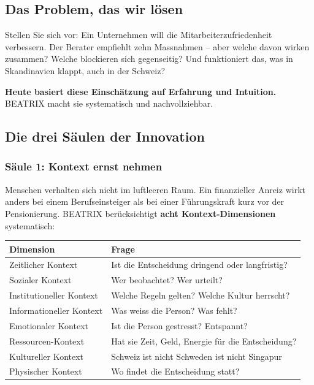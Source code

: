 \documentclass[11pt,a4paper]{article}
\begin{document}
\subsection{Das Problem, das wir lösen}

Stellen Sie sich vor: Ein Unternehmen will die Mitarbeiterzufriedenheit verbessern. Der Berater empfiehlt zehn Massnahmen -- aber welche davon wirken zusammen? Welche blockieren sich gegenseitig? Und funktioniert das, was in Skandinavien klappt, auch in der Schweiz?

\begin{insightbox}
\textbf{Heute basiert diese Einschätzung auf Erfahrung und Intuition.} BEATRIX macht sie systematisch und nachvollziehbar.
\end{insightbox}

\subsection{Die drei Säulen der Innovation}

\subsubsection{Säule 1: Kontext ernst nehmen}

Menschen verhalten sich nicht im luftleeren Raum. Ein finanzieller Anreiz wirkt anders bei einem Berufseinsteiger als bei einer Führungskraft kurz vor der Pensionierung. BEATRIX berücksichtigt \textbf{acht Kontext-Dimensionen} systematisch:

\begin{table}[h]
\centering
\begin{tabularx}{\textwidth}{lX}
\toprule
\textbf{Dimension} & \textbf{Frage} \\
\midrule
Zeitlicher Kontext & Ist die Entscheidung dringend oder langfristig? \\
Sozialer Kontext & Wer beobachtet? Wer urteilt? \\
Institutioneller Kontext & Welche Regeln gelten? Welche Kultur herrscht? \\
Informationeller Kontext & Was weiss die Person? Was fehlt? \\
Emotionaler Kontext & Ist die Person gestresst? Entspannt? \\
Ressourcen-Kontext & Hat sie Zeit, Geld, Energie für die Entscheidung? \\
Kultureller Kontext & Schweiz ist nicht Schweden ist nicht Singapur \\
Physischer Kontext & Wo findet die Entscheidung statt? \\
\bottomrule
\end{tabularx}
\end{table}
\end{document}
